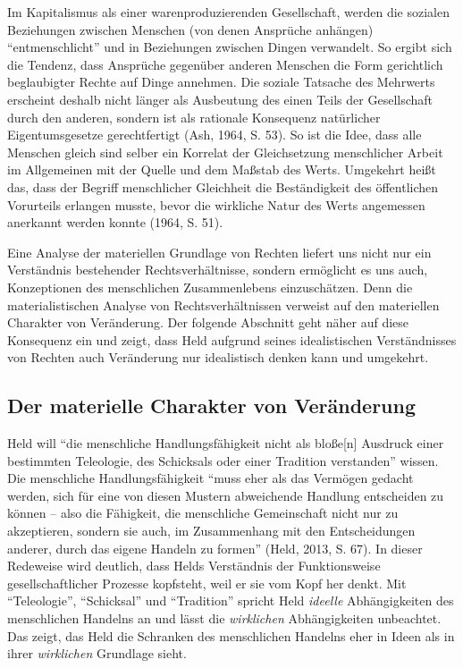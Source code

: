 \documentclass[ngerman,12pt, titlepage, smallheadings, nomath]{scrartcl}
\begin{document}
Im Kapitalismus als einer warenproduzierenden Gesellschaft, werden die
sozialen Beziehungen zwischen Menschen (von denen Ansprüche anhängen)
\enquote{entmenschlicht} und in Beziehungen zwischen Dingen verwandelt.
So ergibt sich die Tendenz, dass Ansprüche gegenüber anderen Menschen
die Form gerichtlich beglaubigter Rechte auf Dinge annehmen. Die soziale
Tatsache des Mehrwerts erscheint deshalb nicht länger als Ausbeutung des
einen Teils der Gesellschaft durch den anderen, sondern ist als
rationale Konsequenz natürlicher Eigentumsgesetze gerechtfertigt (Ash,
1964, S. 53). So ist die Idee, dass alle Menschen gleich sind selber ein
Korrelat der Gleichsetzung menschlicher Arbeit im Allgemeinen mit der
Quelle und dem Maßstab des Werts. Umgekehrt heißt das, dass der Begriff
menschlicher Gleichheit die Beständigkeit des öffentlichen Vorurteils
erlangen musste, bevor die wirkliche Natur des Werts angemessen
anerkannt werden konnte (1964, S. 51).

Eine Analyse der materiellen Grundlage von Rechten liefert uns nicht nur
ein Verständnis bestehender Rechtsverhältnisse, sondern ermöglicht es
uns auch, Konzeptionen des menschlichen Zusammenlebens einzuschätzen.
Denn die materialistischen Analyse von Rechtsverhältnissen verweist auf
den materiellen Charakter von Veränderung. Der folgende Abschnitt geht
näher auf diese Konsequenz ein und zeigt, dass Held aufgrund seines
idealistischen Verständnisses von Rechten auch Veränderung nur
idealistisch denken kann und umgekehrt.

\subsection{Der materielle Charakter von
Veränderung}\label{der-materielle-charakter-von-veruxe4nderung}

Held will \enquote{die menschliche Handlungsfähigkeit nicht als
bloße{[}n{]} Ausdruck einer bestimmten Teleologie, des Schicksals oder
einer Tradition verstanden} wissen. Die menschliche Handlungsfähigkeit
\enquote{muss eher als das Vermögen gedacht werden, sich für eine von
diesen Mustern abweichende Handlung entscheiden zu können -- also die
Fähigkeit, die menschliche Gemeinschaft nicht nur zu akzeptieren,
sondern sie auch, im Zusammenhang mit den Entscheidungen anderer, durch
das eigene Handeln zu formen} (Held, 2013, S. 67). In dieser Redeweise
wird deutlich, dass Helds Verständnis der Funktionsweise
gesellschaftlicher Prozesse kopfsteht, weil er sie vom Kopf her denkt.
Mit \enquote{Teleologie}, \enquote{Schicksal} und \enquote{Tradition}
spricht Held \emph{ideelle} Abhängigkeiten des menschlichen Handelns an
und lässt die \emph{wirklichen} Abhängigkeiten unbeachtet. Das zeigt,
das Held die Schranken des menschlichen Handelns eher in Ideen als in
ihrer \emph{wirklichen} Grundlage sieht.
\end{document}
